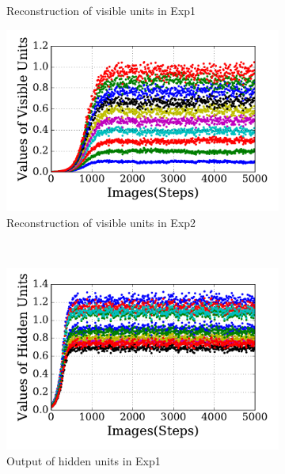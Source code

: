 \begin{figure}
\begin{subfigure}[t]{0.45\textwidth}
		\caption{Reconstruction of visible units in Exp1}
	\end{subfigure}
	\begin{subfigure}[t]{0.45\textwidth}
		\includegraphics[width=\textwidth]{pics_sdlm/21_exp_AE_noise/exp2_recon_s.pdf}
		\caption{Reconstruction of visible units in Exp2}
	\end{subfigure}\\
	\begin{subfigure}[t]{0.45\textwidth}
		\includegraphics[width=\textwidth]{pics_sdlm/21_exp_AE_noise/exp1_hid_s.pdf}
		\caption{Output of hidden units in Exp1}
	\end{subfigure}
	\begin{subfigure}[t]{0.45\textwidth}

\end{subfigure}
\end{figure}

